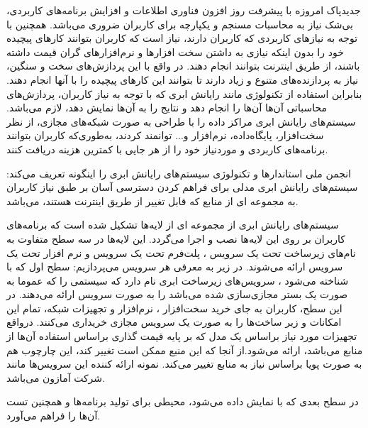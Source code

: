 ‌جدید‌پاک
 امروزه با پیشرفت روز افزون فناوری اطلاعات و افزایش برنامه‌های کاربردی، 
 بی‌شک نیاز به محاسبات مسنجم و یکپارچه برای کاربران ضروری می‌باشد.
 همچنین با توجه به نیازهای کاربردی که کاربران دارند، 
 نیاز است که کاربران بتوانند کارهای پیچیده خود را بدون  اینکه 
 نیازی به داشتن سخت افزارها و نرم‌افزارهای گران قیمت داشته باشند، 
 از طریق اینترنت بتوانند انجام دهند. در واقع با این پردازش‌های سخت و سنگین، 
 نیاز به پردازنده‌های متنوع و زیاد دارند تا بتوانند این کارهای پیچیده را با آنها انجام دهند. بنابراین استفاده از تکنولوژی مانند رایانش ابری که با توجه به نیاز کاربران، پردازش‌های محاسباتی آن‌ها آن‌ها را انجام دهد و نتایج را به آن‌ها 
 نمایش دهد، لازم می‌باشد. سیستم‌های رایانش ابری مراکز داده را با طراحی به صورت شبکه‌های مجازی، از نظر سخت‌افزار، پایگاه‌داده، نرم‌افزار و... توانمند کردند، 
 به‌طوری‌که کاربران بتوانند برنامه‌های کاربردی و موردنیاز خود را از هر جایی  با کمترین هزینه دریافت کنند.
  \cite{define,num2}
  
  انجمن ملی استاندارها و تکنولوژی سیستم‌های رایانش ابری را اینگونه تعریف می‌کند: سیستم‌های رایانش ابری مدلی برای فراهم کردن دسترسی آسان بر طبق نیاز کاربران به مجموعه ای از منابع که قابل تغییر از طریق اینترنت هستند، می‌باشد.
  \cite{define}
  
   سیستم‌های رایانش ابری از مجموعه ای از لایه‌ها تشکیل شده است که برنامه‌های کاربران بر روی این لایه‌ها نصب و اجرا می‌گردد. این لایه‌ها در سه سطح متفاوت به نام‌های زیرساخت تحت یک سرویس
    ، پلت‌فرم تحت یک سرویس
     و نرم ‌افزار تحت یک سرویس
     ارائه می‌شوند. در زیر به معرفی هر سرویس می‌پردازیم:
 سطح اول که با 
 شناخته می‌شود ، سرویس‌های زیرساخت ابری نام دارد که سیستمی‌ را که عموما به صورت یک بستر مجازی‌سازی شده می‌باشد را به صورت سرویس ارائه می‌دهند. در این سطح، کاربران به جای خرید سخت‌افزار ، نرم‌افزار و تجهیزات شبکه، تمام این امکانات و زیر ساخت‌ها را به صورت یک سرویس مجازی خریداری می‌کنند. درواقع تجهیزات مورد نیاز براساس یک مدل که بر پایه قیمت گذاری براساس استفاده آن‌ها از منابع می‌باشد، ارائه می‌شود.از آنجا که این منبع ممکن است تغییر کند، این چارچوب هم به صورت پویا براساس نیاز به منابع تغییر می‌کند. نمونه ارائه کننده این سرویس‌ها مانند شرکت آمازون می‌باشد.
   
 در سطح بعدی که با 
  نمایش داده می‌شود، محیطی برای تولید برنامه‌ها و همچنین تست آن‌ها  را فراهم می‌آورد. 
  
